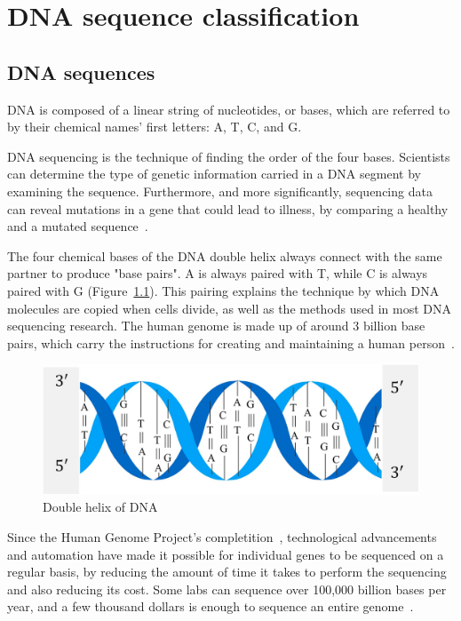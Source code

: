 \chapter{DNA sequence classification} \label{sec:dna_sequences}

\section{DNA sequences} \label{subsec:what_are_dna_sequences}

\gls{DNA} is composed of a linear string of nucleotides, or bases, which are referred to by their chemical names' first letters: \gls{A}, \gls{T}, \gls{C}, and \gls{G}. 

\gls{DNA} sequencing is the technique of finding the order of the four bases. Scientists can determine the type of genetic information carried in a \gls{DNA} segment by examining the sequence. Furthermore, and more significantly, sequencing data can reveal mutations in a gene that could lead to illness, by comparing a healthy and a mutated sequence~\cite{2020DNASheet}.

The four chemical bases of the \gls{DNA} double helix always connect with the same partner to produce "base pairs". \gls{A} is always paired with \gls{T}, while \gls{C} is always paired with \gls{G} (Figure~\ref{fig:dna}). This pairing explains the technique by which \gls{DNA} molecules are copied when cells divide, as well as the methods used in most \gls{DNA} sequencing research. The human \gls{genome} is made up of around 3 billion base pairs, which carry the instructions for creating and maintaining a human person~\cite{2020DNASheet}.

\begin{figure}[htbp]
    \centering
    \includegraphics[width=0.5\linewidth]{Chapters/Figures/dna.jpg}
    \caption{Double helix of DNA~\cite{Yang2020ReviewDNA}}
    \label{fig:dna}
\end{figure}

Since the Human Genome Project's completition~\cite{TheProject}, technological advancements and automation have made it possible for individual genes to be sequenced on a regular basis, by reducing the amount of time it takes to perform the sequencing and also reducing its cost. Some labs can sequence over 100,000 billion bases per year, and a few thousand dollars is enough to sequence an entire \gls{genome}~\cite{2020DNASheet}. 

